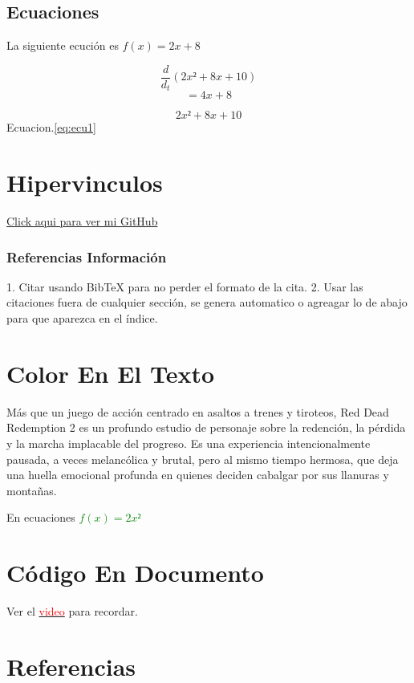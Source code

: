 \documentclass[12pt, letterpaper]{article} %
\begin{document}
\subsection{Ecuaciones}
La siguiente ecución es $f(x)=2x+8$ %

$$\frac{d}{d_t}(2x²+8x+10)$$
$$=4x+8$$

\begin{equation}
    2x²+8x+10
    \label{eq:ecu1}
\end{equation}
Ecuacion.\ref{eq:ecu1}

\section{Hipervinculos}
\href{https://github.com/SARD82}{Click aqui para ver mi GitHub} %

\subsubsection{Referencias Información}
1. Citar usando BibTeX para no perder el formato de la cita.\cite{crowley2021educational} %
2. Usar las citaciones fuera de cualquier sección, se genera automatico o agreagar lo de abajo para que aparezca en el índice. \cite{games2010red}


\section{Color En El Texto}
Más que un juego de acción centrado en asaltos a trenes y tiroteos, Red Dead Redemption 2 
es un profundo estudio de personaje sobre la redención, la pérdida y la marcha implacable del 
progreso. \textcolor{micolor}{Es una experiencia intencionalmente pausada, a veces melancólica y brutal, pero al 
mismo tiempo hermosa, que deja una huella emocional profunda en quienes deciden cabalgar 
por sus llanuras y montañas.} %

En ecuaciones \textcolor{green}{$f(x)=2x²$}

\section{Código En Documento}
Ver el \href{https://www.youtube.com/watch?v=Z9Yg3nCWqKk&list=PLxRI-CzeuZzcxfbyj1swsZkQ2oWZPDs5t&index=14}{\textcolor{red}{video}} para recordar.


\section{Referencias}
\vspace{-0.7cm}
\renewcommand{\refname}{}
\end{document}
